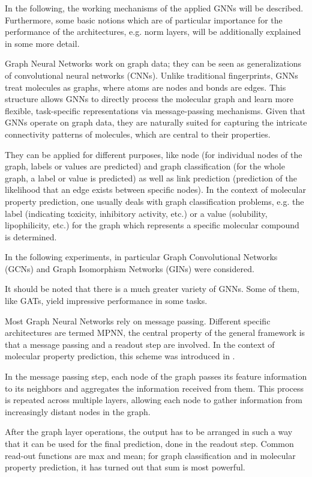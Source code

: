 In the following, the working mechanisms of the applied GNNs will be described. Furthermore, some basic notions which are of particular importance for the performance of the architectures, e.g. norm layers, will be additionally explained in some more detail.


Graph Neural Networks work on graph data; they can be seen as generalizations of convolutional neural networks (CNNs).
Unlike traditional fingerprints, GNNs treat molecules as graphs, where atoms are nodes and bonds are edges. This structure allows GNNs to directly process the molecular graph and learn more flexible, task-specific representations via message-passing mechanisms. Given that GNNs operate on graph data, they are naturally suited for capturing the intricate connectivity patterns of molecules, which are central to their properties.

They can be applied for different purposes, like node (for individual nodes of the graph, labels or values are predicted)    and graph classification (for the whole graph, a label or value is predicted) as well as link prediction (prediction of the likelihood that an edge exists between specific nodes). In the context of molecular property prediction, one usually deals with graph classification problems, e.g. the label (indicating toxicity, inhibitory activity, etc.) or a value (solubility, lipophilicity, etc.) for the graph which represents a specific molecular compound is determined.

In the following experiments, in particular Graph Convolutional Networks (GCNs) and Graph Isomorphism Networks (GINs) were considered.

It should be noted that there is a much greater variety of GNNs. Some of them, like GATs, yield impressive performance in some tasks.

Most Graph Neural Networks rely on message passing. Different specific architectures are termed MPNN, the central property of the general framework is that a message passing and a readout step are involved. In the context of molecular property prediction, this scheme was introduced in \cite{Gilmer.05.04.2017}.

In the message passing step, each node of the graph passes its feature information to its neighbors and aggregates the information received from them. This process is repeated across multiple layers, allowing each node to gather information from increasingly distant nodes in the graph.

After the graph layer operations, the output has to be arranged in such a way that it can be used for the final prediction, done in the readout step.
Common read-out functions are max and mean; for graph classification and in molecular property prediction, it has turned out that sum is most powerful.

